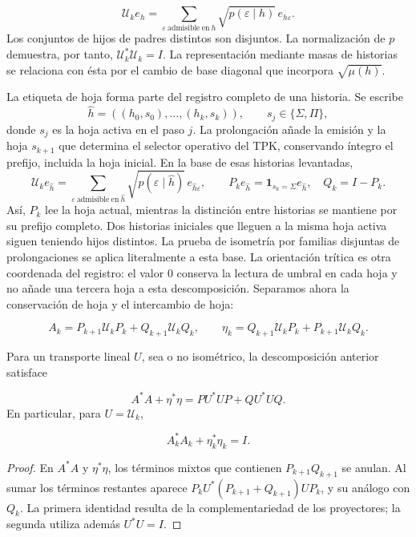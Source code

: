 \[
\mathcal U_ke_h=
\sum_{\varepsilon\ \mathrm{admisible\ en}\ h}
\sqrt{p(\varepsilon\mid h)}\,e_{h\varepsilon}.
\]
Los conjuntos de hijos de padres distintos son disjuntos. La normalización de \(p\) demuestra, por tanto, \(\mathcal U_k^*\mathcal U_k=I\). La representación mediante masas de historias se relaciona con ésta por el cambio de base diagonal que incorpora \(\sqrt{\mu(h)}\).

La etiqueta de hoja forma parte del registro completo de una historia. Se escribe
\[
\widehat h=((h_0,s_0),\ldots,(h_k,s_k)),\qquad
s_j\in\{\Sigma,\Pi\},
\]
donde \(s_j\) es la hoja activa en el paso \(j\). La prolongación añade la emisión y la hoja \(s_{k+1}\) que determina el selector operativo del TPK, conservando íntegro el prefijo, incluida la hoja inicial. En la base de esas historias levantadas,
\[
\mathcal U_ke_{\widehat h}
=\sum_{\varepsilon\ \mathrm{admisible\ en}\ \widehat h}
\sqrt{p(\varepsilon\mid\widehat h)}\,e_{\widehat h\varepsilon},
\qquad
P_ke_{\widehat h}=\mathbf1_{s_k=\Sigma}e_{\widehat h},\quad
Q_k=I-P_k.
\]
Así, \(P_k\) lee la hoja actual, mientras la distinción entre historias se mantiene por su prefijo completo. Dos historias iniciales que lleguen a la misma hoja activa siguen teniendo hijos distintos. La prueba de isometría por familias disjuntas de prolongaciones se aplica literalmente a esta base.
La orientación trítica es otra coordenada del registro: el valor \(0\) conserva la lectura de umbral en cada hoja y no añade una tercera hoja a esta descomposición. Separamos ahora la conservación de hoja y el intercambio de hoja:

\[
A_k=P_{k+1}\mathcal U_kP_k+Q_{k+1}\mathcal U_kQ_k,
\qquad
\eta_k=Q_{k+1}\mathcal U_kP_k+P_{k+1}\mathcal U_kQ_k.
\]
\begin{proposition}
\label{x_reciprocidad:iv:cont:gram}
Para un transporte lineal \(U\), sea o no isométrico, la descomposición anterior satisface

\[
A^*A+\eta^*\eta=PU^*UP+QU^*UQ.
\]
En particular, para \(U=\mathcal U_k\),

\[
A_k^*A_k+\eta_k^*\eta_k=I.
\]
\end{proposition}
\begin{proof}
En \(A^*A\) y \(\eta^*\eta\), los términos mixtos que contienen \(P_{k+1}Q_{k+1}\) se anulan. Al sumar los términos restantes aparece \(P_kU^*(P_{k+1}+Q_{k+1})UP_k\), y su análogo con \(Q_k\). La primera identidad resulta de la complementariedad de los proyectores; la segunda utiliza además \(U^*U=I\).
\end{proof}

